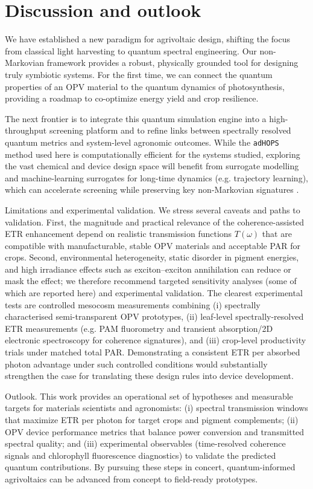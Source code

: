 \documentclass[aps,prb,onecolumn,superscriptaddress,notitlepage,nofootinbib,longbibliography,10pt]{revtex4-2}
\begin{document}
\section{Discussion and outlook}\label{sec:Discussion}

We have established a new paradigm for agrivoltaic design, shifting the focus from classical light harvesting to quantum spectral engineering. Our non-Markovian framework provides a robust, physically grounded tool for designing truly symbiotic systems. For the first time, we can connect the quantum properties of an OPV material to the quantum dynamics of photosynthesis, providing a roadmap to co-optimize energy yield and crop resilience.

The next frontier is to integrate this quantum simulation engine into a high-throughput screening platform and to refine links between spectrally resolved quantum metrics and system-level agronomic outcomes. While the \texttt{adHOPS} method used here is computationally efficient for the systems studied, exploring the vast chemical and device design space will benefit from surrogate modelling and machine-learning surrogates for long-time dynamics (e.g. trajectory learning), which can accelerate screening while preserving key non-Markovian signatures \cite{Ullah2024}.

Limitations and experimental validation. We stress several caveats and paths to validation. First, the magnitude and practical relevance of the coherence-assisted ETR enhancement depend on realistic transmission functions $T(\omega)$ that are compatible with manufacturable, stable OPV materials and acceptable PAR for crops. Second, environmental heterogeneity, static disorder in pigment energies, and high irradiance effects such as exciton–exciton annihilation can reduce or mask the effect; we therefore recommend targeted sensitivity analyses (some of which are reported here) and experimental validation. The clearest experimental tests are controlled mesocosm measurements combining (i) spectrally characterised semi-transparent OPV prototypes, (ii) leaf-level spectrally-resolved ETR measurements (e.g. PAM fluorometry and transient absorption/2D electronic spectroscopy for coherence signatures), and (iii) crop-level productivity trials under matched total PAR. Demonstrating a consistent ETR per absorbed photon advantage under such controlled conditions would substantially strengthen the case for translating these design rules into device development.

Outlook. This work provides an operational set of hypotheses and measurable targets for materials scientists and agronomists: (i) spectral transmission windows that maximize ETR per photon for target crops and pigment complements; (ii) OPV device performance metrics that balance power conversion and transmitted spectral quality; and (iii) experimental observables (time-resolved coherence signals and chlorophyll fluorescence diagnostics) to validate the predicted quantum contributions. By pursuing these steps in concert, quantum-informed agrivoltaics can be advanced from concept to field-ready prototypes.
\end{document}
